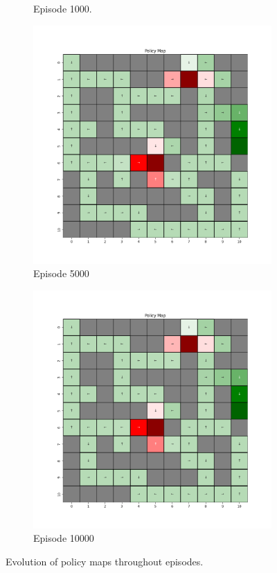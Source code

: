 \documentclass{assignment}
\begin{document}
\begin{figure}[H]
\begin{subfigure}{0.3\textwidth}
    \caption{Episode 1000.}
    \end{subfigure}\hfill
    \begin{subfigure}{0.3\textwidth}
        \includegraphics[width=\textwidth]{figures/policy_td/gamma_sweep/policy_alpha_0.1_gamma_0.5_epsilon_0.2_iteration_5000.png}
    \caption{Episode 5000}
    \end{subfigure}\hfill
    \begin{subfigure}{0.3\textwidth}
        \includegraphics[width=\textwidth]{figures/policy_td/gamma_sweep/policy_alpha_0.1_gamma_0.5_epsilon_0.2_iteration_10000.png}
    \caption{Episode 10000}
    \end{subfigure}
    \caption{Evolution of policy maps throughout episodes.}
    \label{fig:gamma_0.5_td_learning_policy}
\end{figure}
\end{document}
